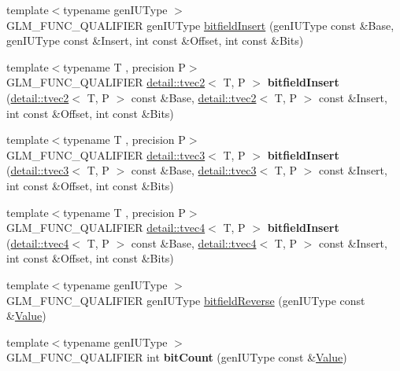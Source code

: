 \begin{DoxyCompactItemize}
\item 
{\footnotesize template$<$typename gen\+I\+U\+Type $>$ }\\G\+L\+M\+\_\+\+F\+U\+N\+C\+\_\+\+Q\+U\+A\+L\+I\+F\+I\+ER gen\+I\+U\+Type \hyperlink{group__core__func__integer_ga7ab09972d52094d97d2480982e657dd0}{bitfield\+Insert} (gen\+I\+U\+Type const \&Base, gen\+I\+U\+Type const \&Insert, int const \&Offset, int const \&Bits)
\item 
{\footnotesize template$<$typename T , precision P$>$ }\\G\+L\+M\+\_\+\+F\+U\+N\+C\+\_\+\+Q\+U\+A\+L\+I\+F\+I\+ER \hyperlink{structglm_1_1detail_1_1tvec2}{detail\+::tvec2}$<$ T, P $>$ {\bfseries bitfield\+Insert} (\hyperlink{structglm_1_1detail_1_1tvec2}{detail\+::tvec2}$<$ T, P $>$ const \&Base, \hyperlink{structglm_1_1detail_1_1tvec2}{detail\+::tvec2}$<$ T, P $>$ const \&Insert, int const \&Offset, int const \&Bits)\hypertarget{namespaceglm_a3fe5875041ab0644094ed8866cfbf414}{}\label{namespaceglm_a3fe5875041ab0644094ed8866cfbf414}

\item 
{\footnotesize template$<$typename T , precision P$>$ }\\G\+L\+M\+\_\+\+F\+U\+N\+C\+\_\+\+Q\+U\+A\+L\+I\+F\+I\+ER \hyperlink{structglm_1_1detail_1_1tvec3}{detail\+::tvec3}$<$ T, P $>$ {\bfseries bitfield\+Insert} (\hyperlink{structglm_1_1detail_1_1tvec3}{detail\+::tvec3}$<$ T, P $>$ const \&Base, \hyperlink{structglm_1_1detail_1_1tvec3}{detail\+::tvec3}$<$ T, P $>$ const \&Insert, int const \&Offset, int const \&Bits)\hypertarget{namespaceglm_ac119fb710c26ac07213e39e16ce02b39}{}\label{namespaceglm_ac119fb710c26ac07213e39e16ce02b39}

\item 
{\footnotesize template$<$typename T , precision P$>$ }\\G\+L\+M\+\_\+\+F\+U\+N\+C\+\_\+\+Q\+U\+A\+L\+I\+F\+I\+ER \hyperlink{structglm_1_1detail_1_1tvec4}{detail\+::tvec4}$<$ T, P $>$ {\bfseries bitfield\+Insert} (\hyperlink{structglm_1_1detail_1_1tvec4}{detail\+::tvec4}$<$ T, P $>$ const \&Base, \hyperlink{structglm_1_1detail_1_1tvec4}{detail\+::tvec4}$<$ T, P $>$ const \&Insert, int const \&Offset, int const \&Bits)\hypertarget{namespaceglm_ad9cf2cd98236c704a80098f2bc801fcf}{}\label{namespaceglm_ad9cf2cd98236c704a80098f2bc801fcf}

\item 
{\footnotesize template$<$typename gen\+I\+U\+Type $>$ }\\G\+L\+M\+\_\+\+F\+U\+N\+C\+\_\+\+Q\+U\+A\+L\+I\+F\+I\+ER gen\+I\+U\+Type \hyperlink{group__core__func__integer_gac28880e609c6eeb0a28f1a54b1edc715}{bitfield\+Reverse} (gen\+I\+U\+Type const \&\hyperlink{document_8h_a071cf97155ba72ac9a1fc4ad7e63d481}{Value})
\item 
{\footnotesize template$<$typename gen\+I\+U\+Type $>$ }\\G\+L\+M\+\_\+\+F\+U\+N\+C\+\_\+\+Q\+U\+A\+L\+I\+F\+I\+ER int {\bfseries bit\+Count} (gen\+I\+U\+Type const \&\hyperlink{document_8h_a071cf97155ba72ac9a1fc4ad7e63d481}{Value})\hypertarget{namespaceglm_a3327aadbf9816a3f8b182cbd9bcb1aac}{}\label{namespaceglm_a3327aadbf9816a3f8b182cbd9bcb1aac}


\end{DoxyCompactItemize}
